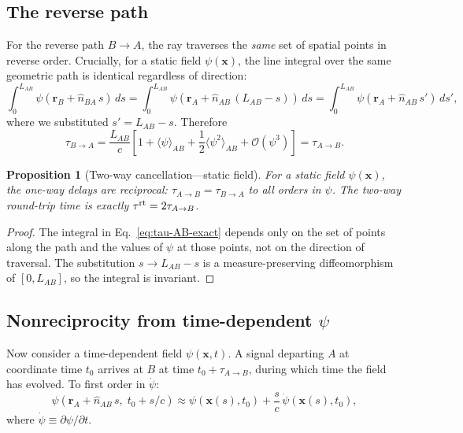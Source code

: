 \documentclass[aps,prd,twocolumn,superscriptaddress,nofootinbib,longbibliography]{revtex4-2}
\newtheorem{proposition}[theorem]{Proposition}
\begin{document}
\subsection{The reverse path}\label{sec:reverse}

For the reverse path $B\to A$, the ray traverses the \emph{same} set of
spatial points in reverse order. Crucially, for a static field $\psi(\mathbf{x})$,
the line integral over the same geometric path is identical regardless of
direction:
\begin{equation}\label{eq:reverse-same}
\int_0^{L_{AB}} \psi(\mathbf{r}_B + \hat{n}_{BA}\,s)\,ds
= \int_0^{L_{AB}} \psi(\mathbf{r}_A + \hat{n}_{AB}\,(L_{AB}-s))\,ds
= \int_0^{L_{AB}} \psi(\mathbf{r}_A + \hat{n}_{AB}\,s')\,ds',
\end{equation}
where we substituted $s' = L_{AB} - s$. Therefore
\begin{equation}\label{eq:tau-BA}
\tau_{B\to A} = \frac{L_{AB}}{c}\left[1 + \langle\psi\rangle_{AB}
+ \frac{1}{2}\langle\psi^2\rangle_{AB} + \mathcal{O}(\psi^3)\right]
= \tau_{A\to B}.
\end{equation}

\begin{proposition}[Two-way cancellation---static field]\label{prop:two-way-static}
For a static field $\psi(\mathbf{x})$, the one-way delays are reciprocal:
$\tau_{A\to B} = \tau_{B\to A}$ to all orders in $\psi$. The two-way
round-trip time is exactly $\tau^{\rm rt} = 2\tau_{A\to B}$.
\end{proposition}

\begin{proof}
The integral in Eq.~\eqref{eq:tau-AB-exact} depends only on the set of
points along the path and the values of $\psi$ at those points, not on
the direction of traversal. The substitution $s \to L_{AB} - s$ is a
measure-preserving diffeomorphism of $[0, L_{AB}]$, so the integral is
invariant.
\end{proof}

\subsection{Nonreciprocity from time-dependent $\psi$}\label{sec:time-dep}

Now consider a time-dependent field $\psi(\mathbf{x}, t)$. A signal
departing $A$ at coordinate time $t_0$ arrives at $B$ at time
$t_0 + \tau_{A\to B}$, during which time the field has evolved. To
first order in $\dot{\psi}$:
\begin{equation}\label{eq:psi-time-dep}
\psi(\mathbf{r}_A + \hat{n}_{AB}\,s,\; t_0 + s/c) \approx
\psi(\mathbf{x}(s), t_0) + \frac{s}{c}\,\dot{\psi}(\mathbf{x}(s), t_0),
\end{equation}
where $\dot{\psi} \equiv \partial\psi/\partial t$.
\end{document}
